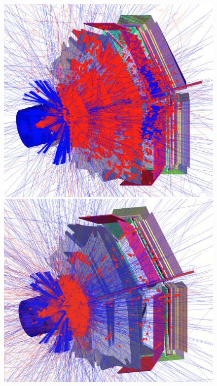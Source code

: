 \documentclass[final,3p,twocolumn]{elsarticle}
\begin{document}
\begin{figure}[htbp!]
\centerline{
	\includegraphics[width=1.0\columnwidth, height=1.0\columnwidth]{NoField.png}
	\includegraphics[width=1.0\columnwidth, height=1.0\columnwidth]{NoSolenoidFullTorus.png}
}
\end{figure}
\end{document}
